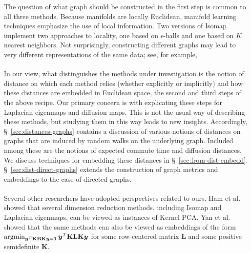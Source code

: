 \documentclass[10pt,twocolumn]{article}
\numberwithin{equation}{section}
\newcommand{\argmin}{\operatornamewithlimits{argmin}}
\begin{document}
The question of what graph should be constructed in the first step is
common to all three methods.  Because manifolds are locally Euclidean,
manifold learning techniques emphasize the use of local information.   
Two versions of Isomap implement two approaches to locality, one
based on $\epsilon$-balls and one based on $K$ nearest neighbors.
Not surprisingly, constructing different graphs may lead to very
different representations of the same data;
 see, for example,
\cite{maier08:_influen,hein07:_conver_laplac} \\ \\
%
%
\noindent
In our view, what distinguishes the methods under investigation is 
the notion of distance on which each method relies (whether explicitly
or implicitly) and how these distances are embedded in Euclidean space, 
the second and third steps of the above recipe.  Our primary 
concern is with explicating these steps for Laplacian eigenmaps
and diffusion maps.  This is not the usual way of describing these methods,
but studying them in this way leads to new insights.
Accordingly, \S~\ref{sec:distances-graphs} contains a discussion of various
notions of distances on graphs that are induced by random walks on the
underlying graph. Included among these are the notions of expected
commute time and diffusion distances. We discuss techniques for embedding these
distances in \S~\ref{sec:from-dist-embedd}.
\S~\ref{sec:dist-direct-graphs}
extends the construction of graph metrics and embeddings to the
case of directed graphs. \\ \\
%
\noindent
Several other researchers have adopted perspectives related to ours.
Ham et al.\
 \cite{ham04} showed that several dimension reduction methods, including
Isomap and Laplacian eigenmaps, can be viewed as instances of
Kernel PCA. 
Yan et al.\ 
\cite{yan07:_graph_embed_exten} showed that the same
methods can also be viewed as embeddings of the
form $\argmin_{\bm{y}^{T} \mathbf{K}\mathbf{B} \mathbf{K} \bm{y} =
  \bm{1}} \bm{y}^{T} \mathbf{K} \mathbf{L} \mathbf{K} \bm{y}$ for some
row-centered matrix $\mathbf{L}$ and some positive semidefinite
$\mathbf{K}$.
\end{document}
